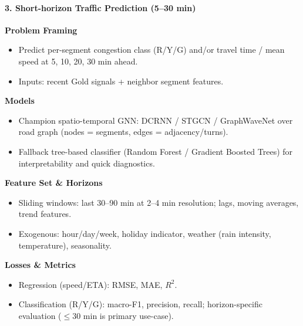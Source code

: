 \paragraph{3. Short-horizon Traffic Prediction (5--30 min)}
	\textbf{Problem Framing}
\begin{itemize}
  \item Predict per-segment congestion class (R/Y/G) and/or travel time / mean speed at 5, 10, 20, 30 min ahead.
  \item Inputs: recent Gold signals + neighbor segment features.
\end{itemize}
	\textbf{Models}
\begin{itemize}
  \item Champion spatio-temporal GNN: DCRNN / STGCN / GraphWaveNet over road graph (nodes = segments, edges = adjacency/turns).
  \item Fallback tree-based classifier (Random Forest / Gradient Boosted Trees) for interpretability and quick diagnostics.
\end{itemize}
	\textbf{Feature Set \& Horizons}
\begin{itemize}
  \item Sliding windows: last 30--90 min at 2--4 min resolution; lags, moving averages, trend features.
  \item Exogenous: hour/day/week, holiday indicator, weather (rain intensity, temperature), seasonality.
\end{itemize}
	\textbf{Losses \& Metrics}
\begin{itemize}
  \item Regression (speed/ETA): RMSE, MAE, $R^2$.
  \item Classification (R/Y/G): macro-F1, precision, recall; horizon-specific evaluation ($\le 30$ min is primary use-case).
\end{itemize}

